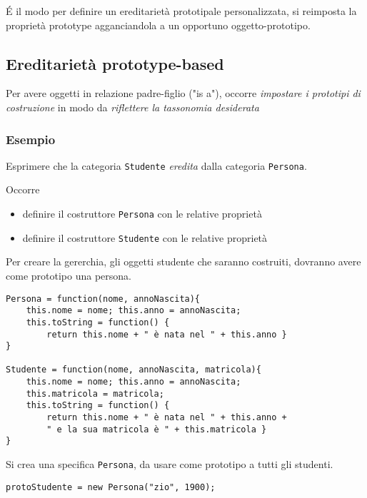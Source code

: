 É il modo per definire un ereditarietà prototipale personalizzata, si reimposta la proprietà prototype agganciandola a un opportuno oggetto-prototipo.

\subsection{Ereditarietà prototype-based}
Per avere oggetti in relazione padre-figlio ("is a"), occorre \textit{impostare i prototipi di costruzione} in modo da \textit{riflettere la tassonomia desiderata}

\subsubsection{Esempio}
Esprimere che la categoria \texttt{Studente} \textit{eredita} dalla categoria \texttt{Persona}.

Occorre
\begin{itemize}
    \item definire il costruttore \texttt{Persona} con le relative proprietà
    \item definire il costruttore \texttt{Studente} con le relative proprietà
\end{itemize}

Per creare la gererchia, gli oggetti studente che saranno costruiti, dovranno avere come prototipo una persona.

\begin{verbatim}
Persona = function(nome, annoNascita){
    this.nome = nome; this.anno = annoNascita;
    this.toString = function() {
        return this.nome + " è nata nel " + this.anno }
}

Studente = function(nome, annoNascita, matricola){
    this.nome = nome; this.anno = annoNascita;
    this.matricola = matricola;
    this.toString = function() {
        return this.nome + " è nata nel " + this.anno +
        " e la sua matricola è " + this.matricola }
}
\end{verbatim}

Si crea una specifica \texttt{Persona}, da usare come prototipo a tutti gli studenti.
\begin{verbatim}
protoStudente = new Persona("zio", 1900);
\end{verbatim}

